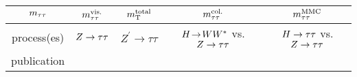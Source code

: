 \begin{tabular}{c||c|c|c|c}
  $m_{\tau\tau}$  & $m_{\tau\tau}^\text{vis.}$              & $m_{\text{T}}^\text{total}$                      & $m_{\tau\tau}^\text{col.}$               & $m_{\tau\tau}^\text{MMC}$                   \\
  \hline
  process(es) & $Z\rightarrow\tau\tau$           & $Z^\prime\rightarrow\tau\tau$ & $H \!\rightarrow\! WW^\ast$ vs. $Z\rightarrow\tau\tau$ & $H\rightarrow\tau\tau$ vs. $Z\rightarrow\tau\tau$ \\
  publication & \cite{PERF-2013-06}  & \cite{EXOT-2012-03}           & \cite{HIGG-2013-13}   & \cite{HIGG-2013-32}       \\
\end{tabular}
